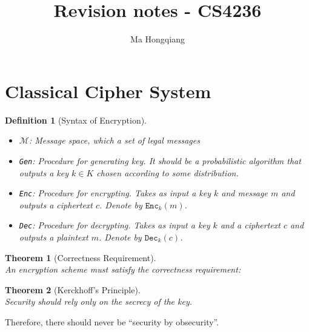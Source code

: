 \documentclass[12pt]{article}
\newtheorem{definition}{Definition}[section]
\newtheorem{theorem}{Theorem}[section]
\theoremstyle{definition}
\begin{document}
\title{Revision notes - CS4236}
\author{Ma Hongqiang}
\maketitle
\tableofcontents

\clearpage
\section{Classical Cipher System}
\begin{definition}[Syntax of Encryption]
\hfill\\\normalfont 
\begin{itemize}
\item $\mathcal{M}$: Message space, which a set of legal messages
\item \texttt{Gen}: Procedure for generating key. It should be a probabilistic algorithm that outputs a key $k\in K$ chosen according to some distribution.
\item \texttt{Enc}: Procedure for encrypting. Takes as input a key $k$ and message $m$ and outputs a ciphertext $c$. Denote by $\texttt{Enc}_k(m)$.
\item \texttt{Dec}: Procedure for decrypting. Takes as input a key $k$ and a ciphertext $c$ and outputs a plaintext $m$. Denote by $\texttt{Dec}_k(c)$.
\end{itemize}
\end{definition}
\begin{theorem}[Correctness Requirement]
\hfill\\\normalfont An encryption scheme must satisfy the correctness requirement: \\
\end{theorem}
\begin{theorem}[Kerckhoff's Principle]
\hfill\\\normalfont Security should rely \textit{only} on the secrecy of the key.
\end{theorem}
Therefore, there should never be ``security by obsecurity''.
\end{document}
